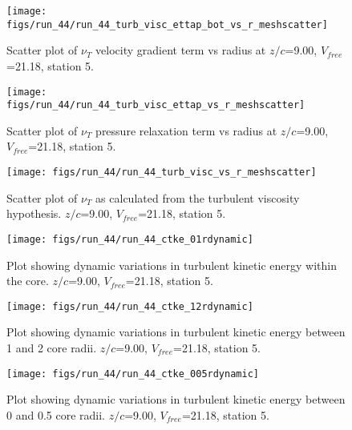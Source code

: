 \begin{figure}[H]
\centering
\texttt{[image: figs/run\_44/run\_44\_turb\_visc\_ettap\_bot\_vs\_r\_meshscatter]}
\caption{Scatter plot of $\nu_T$ velocity gradient term vs radius at $z/c$=9.00, $V_{free}$=21.18, station 5.}
\end{figure}


\begin{figure}[H]
\centering
\texttt{[image: figs/run\_44/run\_44\_turb\_visc\_ettap\_vs\_r\_meshscatter]}
\caption{Scatter plot of $\nu_T$ pressure relaxation term vs radius at $z/c$=9.00, $V_{free}$=21.18, station 5.}
\end{figure}


\begin{figure}[H]
\centering
\texttt{[image: figs/run\_44/run\_44\_turb\_visc\_vs\_r\_meshscatter]}
\caption{Scatter plot of $\nu_T$ as calculated from the turbulent viscosity hypothesis. $z/c$=9.00, $V_{free}$=21.18, station 5.}
\end{figure}


\begin{figure}[H]
\centering
\texttt{[image: figs/run\_44/run\_44\_ctke\_01rdynamic]}
\caption{Plot showing dynamic variations in turbulent kinetic energy within the core. $z/c$=9.00, $V_{free}$=21.18, station 5.}
\end{figure}


\begin{figure}[H]
\centering
\texttt{[image: figs/run\_44/run\_44\_ctke\_12rdynamic]}
\caption{Plot showing dynamic variations in turbulent kinetic energy between 1 and 2 core radii. $z/c$=9.00, $V_{free}$=21.18, station 5.}
\end{figure}


\begin{figure}[H]
\centering
\texttt{[image: figs/run\_44/run\_44\_ctke\_005rdynamic]}
\caption{Plot showing dynamic variations in turbulent kinetic energy between 0 and 0.5 core radii. $z/c$=9.00, $V_{free}$=21.18, station 5.}
\end{figure}



